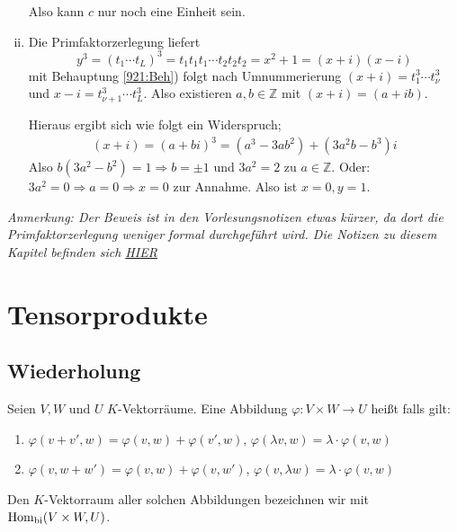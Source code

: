 \begin{enumerate}[i)]
	Also kann $c$ nur noch eine Einheit sein.
	\item Die Primfaktorzerlegung liefert 
	\[
		y^3 = (t_1 \cdots t_L)^3 = t_1 t_1 t_1 \cdots t_2 t_2 t_2 = x^2 +1 = (x +i) (x-i)
	\]
	mit Behauptung \ref{921:Beh}) folgt nach Umnummerierung $(x+i)= t_1 ^3 \cdots t_{\nu} ^3$ und $x-i = t_{\nu +1} ^3 \cdots t_L^3$. Also existieren $a,b \in \mathds{Z}$ mit 
	$(x+i)= (a+ ib)$.
	
	Hieraus ergibt sich wie folgt ein Widerspruch;
	\begin{align*}
		(x+i) = (a+ bi)^3 = (a^3 - 3 ab^2) + (3a^2b - b^3)i
	\end{align*}
	Also $b (3a^2 - b^2) = 1 \Rightarrow b = \pm 1$ und $3 a^2 = 2$  \light   zu $a \in \mathds{Z}$. Oder:  $3 a^2 = 0 \Rightarrow a=0 \Rightarrow x=0$ \light zur Annahme. Also ist $x=0, y=1$. \bewende
\end{enumerate}
\vfill
{\color{Honeydew4} \itshape  \footnotesize Anmerkung: Der Beweis ist in den Vorlesungsnotizen etwas kürzer, da dort die Primfaktorzerlegung weniger formal 
durchgeführt wird. Die Notizen zu diesem Kapitel befinden sich 
\href{http://wwwmath.uni-muenster.de/reine/u/topos/lehre/SS2013/LineareAlgebra2/additional/LA2EuklidRingeHIR.pdf}{HIER}}
\newpage
\section{Tensorprodukte} %
\label{sec:10}

\subsection[Wiederholung: bilineare Abbildungen]{Wiederholung} %
\label{sub:101}
Seien $V,W$ und $U$ $K$-Vektorräume. Eine Abbildung $\varphi : V \times W \to U$ heißt  falls gilt:
\begin{enumerate}[(1)]
	\item $\varphi(v+v', w) = \varphi (v,w) +\varphi (v',w)$, $\varphi (\lambda v, w) = \lambda \cdot \varphi(v,w)$
	\item $\varphi(v,w+w') = \varphi(v,w) + \varphi(v,w') $, $\varphi (v, \lambda w) = \lambda \cdot \varphi(v,w)$
\end{enumerate} 
Den $K$-Vektorraum aller solchen Abbildungen bezeichnen wir mit $\operatorname{Hom}_{\mathrm{bi}}(V \times W, U)$.

